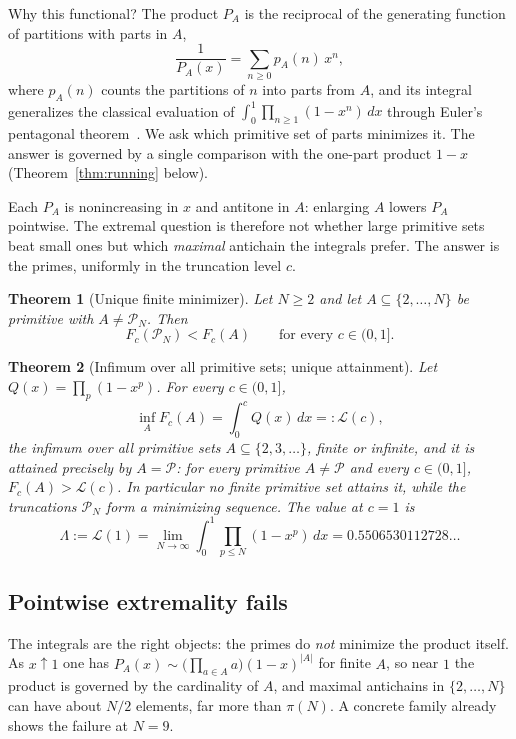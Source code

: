 \documentclass[11pt]{article}
\newtheorem{theorem}{Theorem}[section]
\theoremstyle{remark}
\newcommand{\Prm}{\mathcal{P}}
\begin{document}
Why this functional? The product $P_A$ is the reciprocal of the
generating function of partitions with parts in $A$,
\[
  \frac1{P_A(x)}=\sum_{n\ge0}p_A(n)\,x^n ,
\]
where $p_A(n)$ counts the partitions of $n$ into parts from $A$, and its
integral generalizes the classical evaluation of
$\int_0^1\prod_{n\ge1}(1-x^n)\,dx$ through Euler's pentagonal
theorem~\cite{Sandham1954,Mulcrone1956}. We ask which primitive set of
parts minimizes it. The answer is governed by a single comparison with
the one-part product $1-x$ (Theorem~\ref{thm:running} below).

Each $P_A$ is nonincreasing in $x$ and antitone in $A$: enlarging $A$
lowers $P_A$ pointwise. The extremal
question is therefore not whether large primitive sets beat small ones
but which \emph{maximal} antichain the integrals prefer. The answer is
the primes, uniformly in the truncation level $c$.

\begin{theorem}[Unique finite minimizer]\label{thm:unique}
Let $N\ge2$ and let $A\subseteq\{2,\dots,N\}$ be primitive with
$A\ne\Prm_N$. Then
\[
  F_c(\Prm_N)<F_c(A)\qquad\text{for every }c\in(0,1].
\]
\end{theorem}

\begin{theorem}[Infimum over all primitive sets; unique attainment]
\label{thm:profile}
Let $Q(x)=\prod_p(1-x^p)$. For every $c\in(0,1]$,
\[
  \inf_A F_c(A)=\int_0^cQ(x)\,dx=:\mathcal L(c),
\]
the infimum over \emph{all} primitive sets $A\subseteq\{2,3,\dots\}$,
finite or infinite, and it is attained precisely by $A=\Prm$: for every
primitive $A\ne\Prm$ and every $c\in(0,1]$, $F_c(A)>\mathcal L(c)$. In
particular no finite primitive set attains it, while the truncations
$\Prm_N$ form a minimizing sequence. The value at $c=1$ is
\[
  \Lambda:=\mathcal L(1)=\lim_{N\to\infty}\int_0^1\prod_{p\le N}(1-x^p)\,dx
  =0.5506530112728\ldots
\]
\end{theorem}

\subsection{Pointwise extremality fails}
The integrals are the right objects: the primes do \emph{not} minimize
the product itself. As $x\uparrow1$ one has
$P_A(x)\sim\bigl(\prod_{a\in A}a\bigr)(1-x)^{|A|}$ for finite $A$, so
near $1$ the product is governed by the cardinality of $A$, and maximal
antichains in $\{2,\dots,N\}$ can have about $N/2$ elements, far more
than $\pi(N)$. A concrete family already shows the failure at $N=9$.
\end{document}
